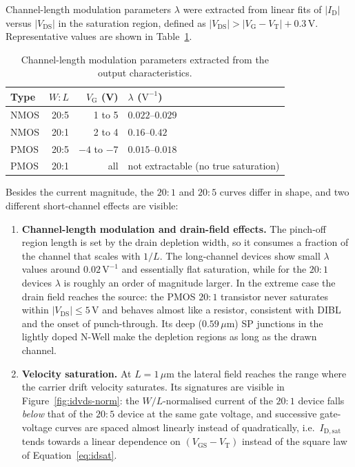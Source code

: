 Channel-length modulation parameters $\lambda$ were extracted from linear fits of $|I_\mathrm{D}|$ versus $|V_\mathrm{DS}|$ in the saturation region, defined as $|V_\mathrm{DS}| > |V_\mathrm{G} - V_\mathrm{T}| + 0.3$\,V. Representative values are shown in Table~\ref{tab:ch6-lambda}.

\begin{table}[htbp]
  \centering
  \caption{Channel-length modulation parameters extracted from the output characteristics.}
  \label{tab:ch6-lambda}
  \begin{tabular}{lrrl}
    \toprule
    Type & $W\!:\!L$ & $V_\mathrm{G}$ (V) & $\lambda$ ($\mathrm{V}^{-1}$) \\
    \midrule
    NMOS & 20:5 & 1 to 5   & $0.022$--$0.029$ \\
    NMOS & 20:1 & 2 to 4   & $0.16$--$0.42$ \\
    PMOS & 20:5 & $-4$ to $-7$ & $0.015$--$0.018$ \\
    PMOS & 20:1 & all  & not extractable (no true saturation) \\
    \bottomrule
  \end{tabular}
\end{table}

Besides the current magnitude, the $20\!:\!1$ and $20\!:\!5$ curves differ in shape, and two different short-channel effects are visible:

\begin{enumerate}
\item \textbf{Channel-length modulation and drain-field effects.} The pinch-off region length is set by the drain depletion width, so it consumes a fraction of the channel that scales with $1/L$. The long-channel devices show small $\lambda$ values around $0.02\,\mathrm{V}^{-1}$ and essentially flat saturation, while for the $20\!:\!1$ devices $\lambda$ is roughly an order of magnitude larger. In the extreme case the drain field reaches the source: the PMOS $20\!:\!1$ transistor never saturates within $|V_\mathrm{DS}| \le 5$\,V and behaves almost like a resistor, consistent with DIBL and the onset of punch-through. Its deep ($0.59\,\mu\mathrm{m}$) SP junctions in the lightly doped N-Well make the depletion regions as long as the drawn channel.
\item \textbf{Velocity saturation.} At $L = 1\,\mu\mathrm{m}$ the lateral field reaches the range where the carrier drift velocity saturates. Its signatures are visible in Figure~\ref{fig:idvds-norm}: the $W/L$-normalised current of the $20\!:\!1$ device falls \emph{below} that of the $20\!:\!5$ device at the same gate voltage, and successive gate-voltage curves are spaced almost linearly instead of quadratically, i.e.\ $I_\mathrm{D,sat}$ tends towards a linear dependence on $(V_\mathrm{GS}-V_\mathrm{T})$ instead of the square law of Equation~\eqref{eq:idsat}.
\end{enumerate}

